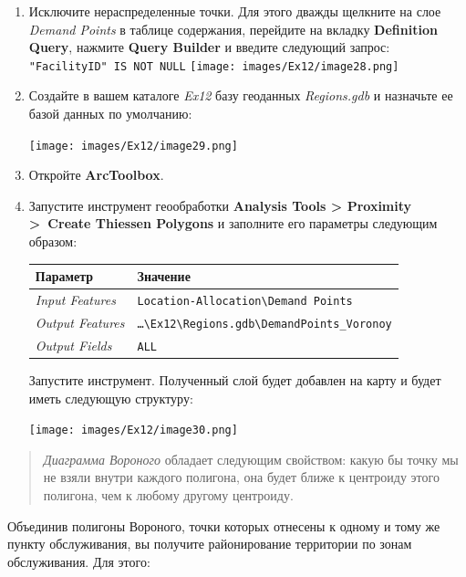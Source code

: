 \documentclass[12pt,]{book}
\begin{document}
\begin{enumerate}
\def\labelenumi{\arabic{enumi}.}
\item
  Исключите нераспределенные точки. Для этого дважды щелкните на слое \emph{Demand Points} в таблице содержания, перейдите на вкладку \textbf{Definition Query}, нажмите \textbf{Query Builder} и введите следующий запрос:
  \texttt{"FacilityID"\ IS\ NOT\ NULL}
  \texttt{[image: images/Ex12/image28.png]}
\item
  Создайте в вашем каталоге \emph{Ex12} базу геоданных \emph{Regions.gdb} и назначьте ее базой данных по умолчанию:

  \texttt{[image: images/Ex12/image29.png]}
\item
  Откройте \textbf{ArcToolbox}.
\item
  Запустите инструмент геообработки \textbf{Analysis Tools \textgreater{} Proximity \textgreater{}~Create Thiessen Polygons} и заполните его параметры следующим образом:

  \begin{longtable}[]{@{}ll@{}}
  \toprule
  Параметр & Значение\tabularnewline
  \midrule
  \endhead
  \emph{Input Features} & \texttt{Location-Allocation\textbackslash{}Demand\ Points}\tabularnewline
  \emph{Output Features} & \texttt{\ldots{}\textbackslash{}Ex12\textbackslash{}Regions.gdb\textbackslash{}DemandPoints\_Voronoy}\tabularnewline
  \emph{Output Fields} & \texttt{ALL}\tabularnewline
  \bottomrule
  \end{longtable}

  Запустите инструмент. Полученный слой будет добавлен на карту и будет иметь следующую структуру:

  \texttt{[image: images/Ex12/image30.png]}
\end{enumerate}

\begin{quote}
\emph{Диаграмма Вороного} обладает следующим свойством: какую бы точку мы не взяли внутри каждого полигона, она будет ближе к центроиду этого полигона, чем к любому другому центроиду.
\end{quote}

Объединив полигоны Вороного, точки которых отнесены к одному и тому же пункту обслуживания, вы получите районирование территории по зонам обслуживания. Для этого:
\end{document}
